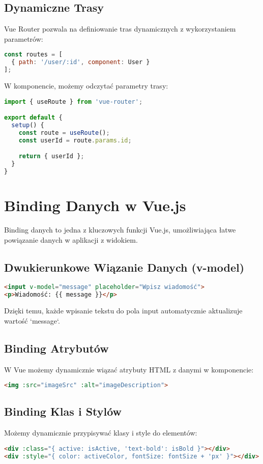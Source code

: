 \documentclass[a4paper,12pt]{article}
\begin{document}
\subsection{Dynamiczne Trasy}
Vue Router pozwala na definiowanie tras dynamicznych z wykorzystaniem parametrów:
\begin{lstlisting}[language=JavaScript]
const routes = [
  { path: '/user/:id', component: User }
];
\end{lstlisting}
W komponencie, możemy odczytać parametry trasy:
\begin{lstlisting}[language=JavaScript]
import { useRoute } from 'vue-router';

export default {
  setup() {
    const route = useRoute();
    const userId = route.params.id;

    return { userId };
  }
}
\end{lstlisting}

\section{Binding Danych w Vue.js}
Binding danych to jedna z kluczowych funkcji Vue.js, umożliwiająca łatwe powiązanie danych w aplikacji z widokiem.

\subsection{Dwukierunkowe Wiązanie Danych (v-model)}
\begin{lstlisting}[language=HTML]
<input v-model="message" placeholder="Wpisz wiadomość">
<p>Wiadomość: {{ message }}</p>
\end{lstlisting}
Dzięki temu, każde wpisanie tekstu do pola input automatycznie aktualizuje wartość `message`.

\subsection{Binding Atrybutów}
W Vue możemy dynamicznie wiązać atrybuty HTML z danymi w komponencie:
\begin{lstlisting}[language=HTML]
<img :src="imageSrc" :alt="imageDescription">
\end{lstlisting}

\subsection{Binding Klas i Stylów}
Możemy dynamicznie przypisywać klasy i style do elementów:
\begin{lstlisting}[language=HTML]
<div :class="{ active: isActive, 'text-bold': isBold }"></div>
<div :style="{ color: activeColor, fontSize: fontSize + 'px' }"></div>
\end{lstlisting}
\end{document}
